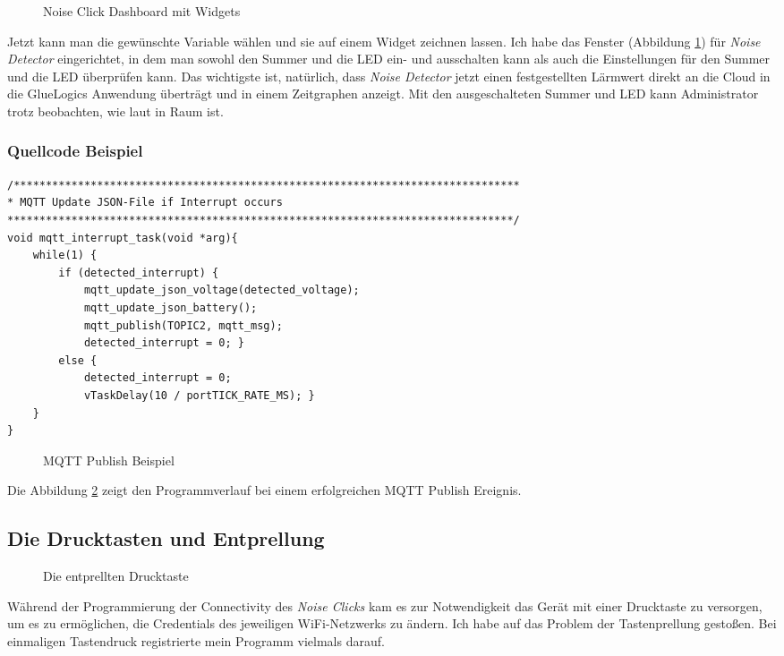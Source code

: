 \begin{figure}[h]
	\centering
	\caption{Noise Click Dashboard mit Widgets}
	\label{fig:dashboard}
\end{figure}

Jetzt kann man die gewünschte Variable wählen und sie auf einem Widget zeichnen lassen. Ich habe das Fenster (Abbildung \ref{fig:dashboard}) für \textit{Noise Detector} eingerichtet, in dem man sowohl den Summer und die LED ein- und ausschalten kann als auch die Einstellungen für den Summer und die LED überprüfen kann. Das wichtigste ist, natürlich, dass \textit{Noise Detector} jetzt einen festgestellten Lärmwert direkt an die Cloud in die GlueLogics Anwendung überträgt und in einem Zeitgraphen anzeigt. Mit den ausgeschalteten Summer und LED kann Administrator trotz beobachten, wie laut in Raum ist. 

 \subsubsection{Quellcode Beispiel}
\begin{lstlisting}
/*******************************************************************************
* MQTT Update JSON-File if Interrupt occurs
*******************************************************************************/
void mqtt_interrupt_task(void *arg){
	while(1) {
		if (detected_interrupt) {
			mqtt_update_json_voltage(detected_voltage);
			mqtt_update_json_battery(); 
			mqtt_publish(TOPIC2, mqtt_msg);
			detected_interrupt = 0; }
		else {
			detected_interrupt = 0;
			vTaskDelay(10 / portTICK_RATE_MS); }
	}
}
\end{lstlisting}

\begin{figure}[h]
	\centering
	\caption{MQTT Publish Beispiel}
	\label{fig:mqttpic}
\end{figure}

Die Abbildung \ref{fig:mqttpic} zeigt den Programmverlauf bei einem erfolgreichen MQTT Publish Ereignis.  

\newpage
\subsection{Die Drucktasten und Entprellung}
\label{sec:main:switch}
\begin{wrapfigure}{l}{0.55\textwidth}
	\centering
	\caption{Die entprellten Drucktaste}
	\label{fig:entp}
\end{wrapfigure}
Während der Programmierung der Connectivity des \textit{Noise Clicks} kam es zur Notwendigkeit das Gerät mit einer Drucktaste zu versorgen, um es zu ermöglichen, die Credentials des jeweiligen WiFi-Netzwerks zu ändern. Ich habe auf das Problem der Tastenprellung gestoßen. Bei einmaligen Tastendruck registrierte mein Programm vielmals darauf. 

